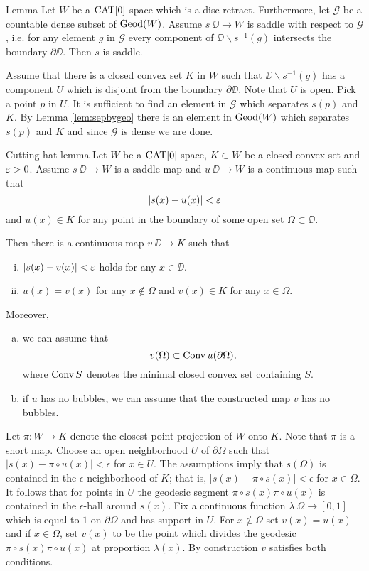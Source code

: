\documentclass[a4paper,10pt]{amsart}
\begin{document}
\begin{thm}{Lemma}\label{lem:saddle-crit}
Let $W$ be a $\mathop{\rm CAT}\nolimits[0]$ space which is a disc retract. 
Furthermore, let $\mathcal{G}$ be a countable dense subset 
of $\mathop{\rm Geod}\nolimits(W)$.
Assume $s\:\DD\to W$ is saddle with respect to $\mathcal{G}$, i.e. for any element $g$ in $\mathcal{G}$ every 
component of $\DD\backslash s^{-1}(g)$ intersects the boundary $\partial\DD$.
Then $s$ is saddle.
\end{thm}

Assume that there is a closed convex set $K$ in $W$ such that 
$\DD\backslash s^{-1}(g)$ has a component $U$ which is disjoint from the boundary $\partial\DD$. 
Note that $U$ is open. 
Pick a point $p$ in $U$. 
It is sufficient to find an element in $\mathcal{G}$ which separates $s(p)$ and $K$. By Lemma \ref{lem:sepbygeo}
there is an element in $\mathop{\rm Geod}\nolimits(W)$ which separates $s(p)$ and $K$ and since $\mathcal{G}$ is dense we are done.
\qeds

\begin{thm}{Cutting hat lemma}\label{lem:cutting-hat}
Let 
$W$ be a $\mathop{\rm CAT}\nolimits[0]$ space, 
$K\subset W$ be a closed convex set 
and $\varepsilon>0$.
Assume $s\:\DD\to W$ is a saddle map 
and $u\:\DD\to W$ is a continuous map such that 
\[|s(x)-u(x)|<\varepsilon\]
and $u(x)\in K$ for any point in the boundary of some open set $\Omega\subset \DD$.

Then there is a continuous map $v\:\DD\to K$ such that 
\begin{enumerate}[(i)]
\item $|s(x)-v(x)|<\varepsilon$ holds for any $x\in\DD$.
\item $u(x)=v(x)$ for any $x\notin\Omega$ and
$v(x)\in K$ for any $x\in\Omega$.
\end{enumerate}

Moreover,
\begin{enumerate}[(a)]
\item we can assume that \[v(\Omega)\subset \mathop{\rm Conv}\nolimits u(\partial\Omega),\]
where $\mathop{\rm Conv}\nolimits S$ denotes the minimal closed convex set containing $S$.
\item\label{lem:cutting-hat:b} if $u$ has no bubbles, we can assume that the constructed map $v$ has no bubbles.
\end{enumerate}
\end{thm}

Let $\pi:W\to K$ denote the closest point projection of $W$ onto $K$. Note that $\pi$
is a short map. Choose an open neighborhood $U$ of $\partial \Omega$ such that 
$|s(x)-\pi\circ u(x)|<\epsilon$ for $x\in U$. The assumptions imply that $s(\Omega)$ is 
contained in the $\epsilon$-neighborhood of $K$;
that is, $|s(x)-\pi\circ s(x)|<\epsilon$ for $x\in\Omega$.
It follows that for points in $U$ the geodesic segment $\pi\circ s(x)\pi\circ u(x)$ is contained in the $\epsilon$-ball
around $s(x)$. Fix a continuous function $\lambda\:\Omega\to [0,1]$
which is equal to $1$ on $\partial \Omega$ and has support in $U$.
For $x\notin \Omega$ set $v(x)=u(x)$ and if 
$x\in \Omega$, set $v(x)$ to be the point which divides the geodesic $\pi\circ s(x)\pi\circ u(x)$
at proportion $\lambda(x)$. By construction $v$ satisfies both conditions.
\end{document}
